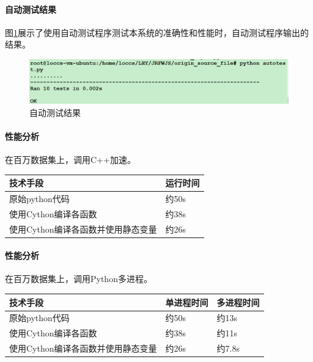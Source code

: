 \paragraph{自动测试结果}
图\ref{fig:sys.param}展示了使用自动测试程序测试本系统的准确性和性能时，自动测试程序输出的结果。
\begin{figure}[H]
\begin{center}
\includegraphics[width=16cm]{img//autotest.PNG}
\caption{自动测试结果}
\label{fig:sys.param}
\end{center}
\end{figure}


\paragraph{性能分析}在百万数据集上，调用C++加速。
\begin{table}[H]
\begin{adjustwidth}{-3cm}{-3cm}
\begin{center}
\begin{tabular}{|p{}| p{}|} \hline
技术手段 & 运行时间  \\ \hline
原始python代码 & 约50s  \\ \hline
使用Cython编译各函数 & 约38s  \\ \hline
使用Cython编译各函数并使用静态变量 & 约26s \\ \hline
\end{tabular}
\end{center}
\end{adjustwidth}
\end{table}

\paragraph{性能分析}在百万数据集上，调用Python多进程。
\begin{table}[H]
\begin{adjustwidth}{-3cm}{-3cm}
\begin{center}
\begin{tabular}{|p{}| p{}|p{}|} \hline
技术手段 & 单进程时间 & 多进程时间 \\ \hline
原始python代码 & 约50s  & 约13s\\ \hline
使用Cython编译各函数 & 约38s  & 约11s\\ \hline
使用Cython编译各函数并使用静态变量 & 约26s & 约7.8s\\ \hline
\end{tabular}
\end{center}
\end{adjustwidth}
\end{table}
